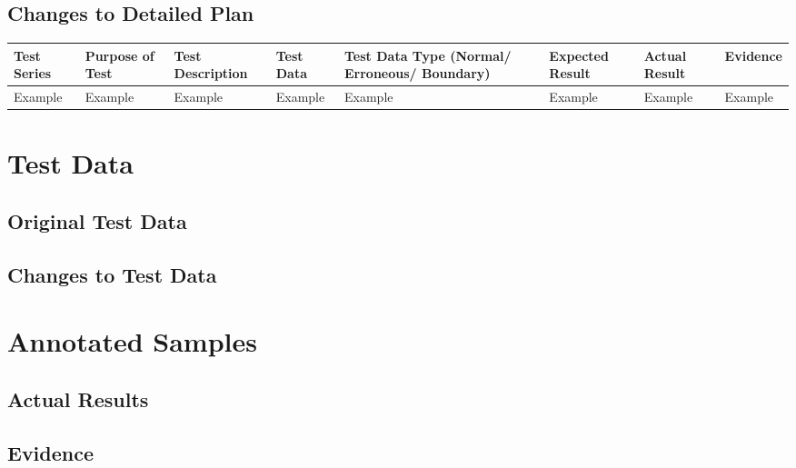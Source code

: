 \begin{landscape}
\begin{center}
\begin{longtable}{|p{1.5cm}|p{2cm}|p{2.5cm}|p{4cm}|p{2cm}|p{2cm}|p{1cm}|p{1.7cm}|}
    \end{longtable}
\end{center}


\subsection{Changes to Detailed Plan}

\begin{center}
    \begin{longtable}{|p{1.5cm}|p{2.5cm}|p{2.5cm}|p{2cm}|p{2cm}|p{2cm}|p{2cm}|p{2cm}|}
        \hline
        \textbf{Test Series} & \textbf{Purpose of Test} & \textbf{Test Description} & \textbf{Test Data} & \textbf{Test Data Type (Normal/ Erroneous/ Boundary)} & \textbf{Expected Result} & \textbf{Actual Result} & \textbf{Evidence}\\ \hline
        Example & Example & Example & Example & Example & Example & Example & Example \\ \hline
    \end{longtable}
\end{center}

\section{Test Data}

\subsection{Original Test Data}

\subsection{Changes to Test Data}

\section{Annotated Samples}

\subsection{Actual Results}

\subsection{Evidence}

\end{landscape}

